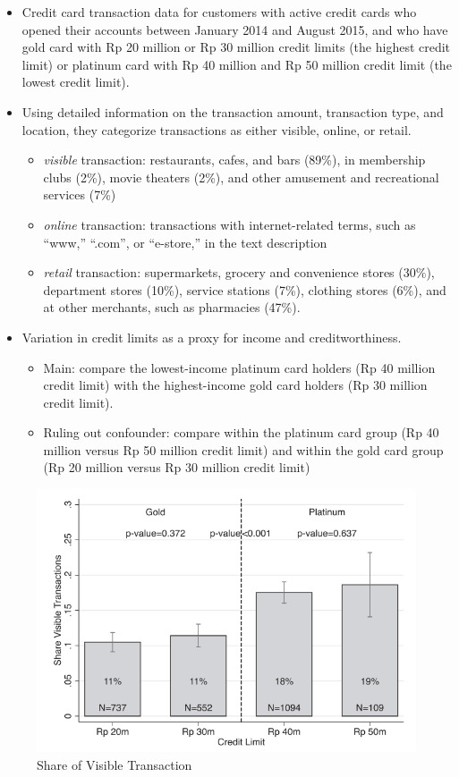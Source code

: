 \documentclass[../root]{subfiles}
\begin{document}
    \begin{itemize}
        \item Credit card transaction data for customers with active credit cards who opened their accounts between January 2014 and August 2015, and who have gold card with Rp 20 million or Rp 30 million credit limits (the highest credit limit) or platinum card with Rp 40 million and Rp 50 million credit limit (the lowest credit limit).
        \item Using detailed information on the transaction amount, transaction type, and location, they categorize transactions as either visible, online, or retail.
        \begin{itemize}
            \item \textit{visible} transaction: restaurants, cafes, and bars (89\%), in membership clubs (2\%), movie theaters (2\%), and other amusement and recreational services (7\%)
            \item \textit{online} transaction: transactions with internet-related terms, such as ``www,'' ``.com'', or ``e-store,'' in the text description
            \item \textit{retail} transaction: supermarkets, grocery and convenience stores (30\%), department stores (10\%), service stations (7\%), clothing stores (6\%), and at other merchants, such as pharmacies (47\%).
        \end{itemize}
        \item Variation in credit limits as a proxy for income and creditworthiness.
        \begin{itemize}
            \item Main: compare the lowest-income platinum card holders (Rp 40 million credit limit) with the highest-income gold card holders (Rp 30 million credit limit).
            \item Ruling out confounder: compare within the platinum card group (Rp 40 million versus Rp 50 million credit limit) and within the gold card group (Rp 20 million versus Rp 30 million credit limit)
        \end{itemize}
    \end{itemize}

    \begin{figure}[h]
        \centering
        \includegraphics[width = 0.8\linewidth]{0717kato/result_obs.PNG}
        \caption{Share of Visible Transaction}
        \label{result2}
    \end{figure}
\end{document}

